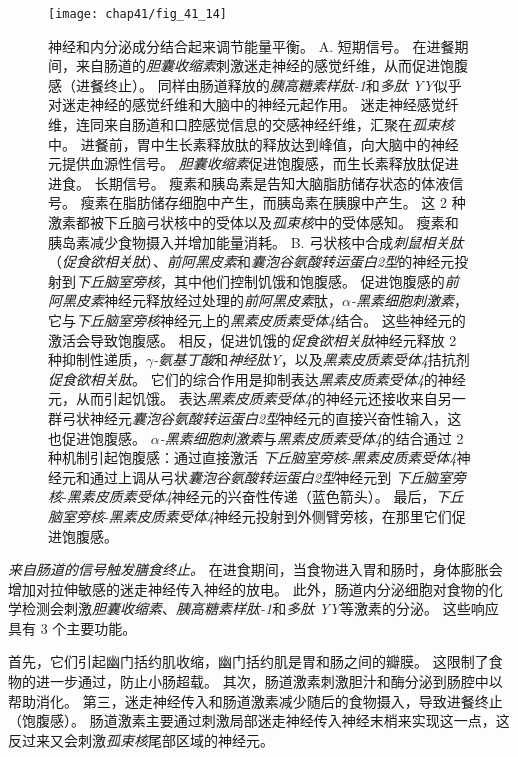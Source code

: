 \begin{figure}[htbp]
	\centering
	\texttt{[image: chap41/fig\_41\_14]}
	\caption{神经和内分泌成分结合起来调节能量平衡。 
		A. 短期信号。
		在进餐期间，来自肠道的\textit{胆囊收缩素}刺激迷走神经的感觉纤维，从而促进饱腹感（进餐终止）。
		同样由肠道释放的\textit{胰高糖素样肽-1}和\textit{多肽 YY}似乎对迷走神经的感觉纤维和大脑中的神经元起作用。
		迷走神经感觉纤维，连同来自肠道和口腔感觉信息的交感神经纤维，汇聚在\textit{孤束核}中。
		进餐前，胃中生长素释放肽的释放达到峰值，向大脑中的神经元提供血源性信号。
		\textit{胆囊收缩素}促进饱腹感，而生长素释放肽促进进食。
		长期信号。
		瘦素和胰岛素是告知大脑脂肪储存状态的体液信号。
		瘦素在脂肪储存细胞中产生，而胰岛素在胰腺中产生。
		这 2 种激素都被下丘脑弓状核中的受体以及\textit{孤束核}中的受体感知。
		瘦素和胰岛素减少食物摄入并增加能量消耗。
		B. 弓状核中合成\textit{刺鼠相关肽}（\textit{促食欲相关肽}）、\textit{前阿黑皮素}和\textit{囊泡谷氨酸转运蛋白2型}的神经元投射到\textit{下丘脑室旁核}，其中他们控制饥饿和饱腹感。
		促进饱腹感的\textit{前阿黑皮素}神经元释放经过处理的\textit{前阿黑皮素}肽，\textit{$\alpha$-黑素细胞刺激素}，它与\textit{下丘脑室旁核}神经元上的\textit{黑素皮质素受体4}结合。
		这些神经元的激活会导致饱腹感。
		相反，促进饥饿的\textit{促食欲相关肽}神经元释放 2 种抑制性递质，\textit{$\gamma$-氨基丁酸}和\textit{神经肽Y}，以及\textit{黑素皮质素受体4}拮抗剂\textit{促食欲相关肽}。
		它们的综合作用是抑制表达\textit{黑素皮质素受体4}的神经元，从而引起饥饿。
		表达\textit{黑素皮质素受体4}的神经元还接收来自另一群弓状神经元\textit{囊泡谷氨酸转运蛋白2型}神经元的直接兴奋性输入，这也促进饱腹感。
		\textit{$\alpha$-黑素细胞刺激素}与\textit{黑素皮质素受体4}的结合通过 2 种机制引起饱腹感：通过直接激活 \textit{下丘脑室旁核}-\textit{黑素皮质素受体4}神经元和通过上调从弓状\textit{囊泡谷氨酸转运蛋白2型}神经元到 \textit{下丘脑室旁核}-\textit{黑素皮质素受体4}神经元的兴奋性传递（蓝色箭头）。
		最后，\textit{下丘脑室旁核}-\textit{黑素皮质素受体4}神经元投射到外侧臂旁核，在那里它们促进饱腹感。}
	\label{fig:41_14}
\end{figure}


\textit{来自肠道的信号触发膳食终止。}
在进食期间，当食物进入胃和肠时，身体膨胀会增加对拉伸敏感的迷走神经传入神经的放电。
此外，肠道内分泌细胞对食物的化学检测会刺激\textit{胆囊收缩素}、\textit{胰高糖素样肽-1}和\textit{多肽 YY}等激素的分泌。
这些响应具有 3 个主要功能。


首先，它们引起幽门括约肌收缩，幽门括约肌是胃和肠之间的瓣膜。
这限制了食物的进一步通过，防止小肠超载。
其次，肠道激素刺激胆汁和酶分泌到肠腔中以帮助消化。
第三，迷走神经传入和肠道激素减少随后的食物摄入，导致进餐终止（饱腹感）。
肠道激素主要通过刺激局部迷走神经传入神经末梢来实现这一点，这反过来又会刺激\textit{孤束核}尾部区域的神经元。


